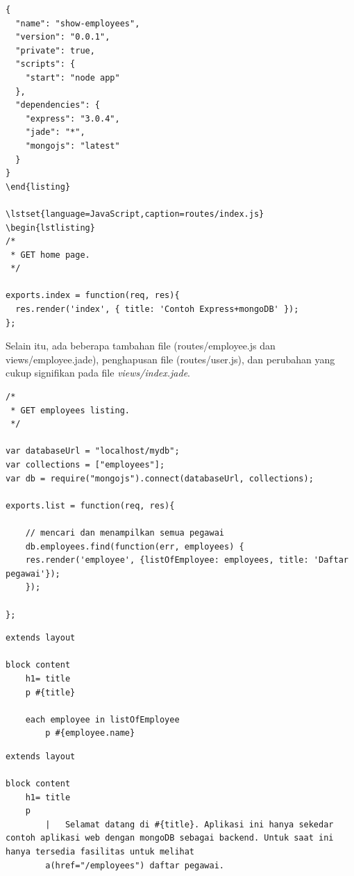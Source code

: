 \lstset{language=JavaScript,caption=package.json}
\begin{lstlisting}
{
  "name": "show-employees",
  "version": "0.0.1",
  "private": true,
  "scripts": {
    "start": "node app"
  },
  "dependencies": {
    "express": "3.0.4",
    "jade": "*",
    "mongojs": "latest"
  }
}
\end{listing}

\lstset{language=JavaScript,caption=routes/index.js}
\begin{lstlisting}
/*
 * GET home page.
 */

exports.index = function(req, res){
  res.render('index', { title: 'Contoh Express+mongoDB' });
};
\end{lstlisting}

Selain itu, ada beberapa tambahan file (routes/employee.js dan views/employee.jade), penghapusan file (routes/user.js), dan perubahan yang cukup signifikan pada file \textit{views/index.jade}.

\lstset{language=JavaScript,caption=routes/employee.js}
\begin{lstlisting}
/*
 * GET employees listing.
 */

var databaseUrl = "localhost/mydb";
var collections = ["employees"];
var db = require("mongojs").connect(databaseUrl, collections);

exports.list = function(req, res){

	// mencari dan menampilkan semua pegawai
	db.employees.find(function(err, employees) {
  	res.render('employee', {listOfEmployee: employees, title: 'Daftar pegawai'});
	});

};
\end{lstlisting}

\lstset{language=html,caption=views/employee.jade}
\begin{lstlisting}
extends layout

block content
	h1= title
	p #{title}

	each employee in listOfEmployee
		p #{employee.name}
\end{lstlisting}

\lstset{language=html,caption=views/index.jade}
\begin{lstlisting}
extends layout

block content
	h1= title
	p 
		|	Selamat datang di #{title}. Aplikasi ini hanya sekedar contoh aplikasi web dengan mongoDB sebagai backend. Untuk saat ini hanya tersedia fasilitas untuk melihat 
		a(href="/employees") daftar pegawai.
\end{lstlisting}

